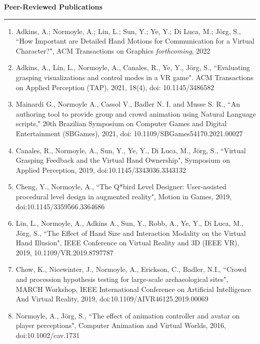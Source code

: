 {\Large {\bf  Peer-Reviewed Publications}}
\vspace{0.1cm}
\hrule
\medskip

\begin{enumerate}[leftmargin=*]

\item Adkins, A.; Normoyle, A.; Lin, L.; Sun, Y.; Ye, Y.; Di Luca, M.; J\"{o}rg, S., ``How Important are Detailed Hand Motions for Communication for a Virtual Character?", ACM Transactions on Graphics \emph{forthcoming}, 2022

\item Adkins, A., Lin, L., Normoyle, A., Canales, R., Ye, Y., J\"{o}rg, S., ``Evaluating grasping visualizations and control modes in a VR game". ACM Transactions on Applied Perception (TAP), 2021, 18(4), doi: 10.1145/3486582

\item Mainardi G., Normoyle A., Cassol V., Badler N. I. and Musse S. R., ``An authoring tool to provide group and crowd animation using Natural Language scripts," 20th Brazilian Symposium on Computer Games and Digital Entertainment (SBGames), 2021, doi: 10.1109/SBGames54170.2021.00027

\item Canales, R., Normoyle, A., Sun, Y., Ye, Y., Di Luca, M., J\"{o}rg, S., ``Virtual Grasping Feedback and the Virtual Hand Ownership", Symposium on Applied Perception, 2019, doi:10.1145/3343036.3343132

\item Cheng, Y., Normoyle, A., ``The Q*bird Level Designer: User-assisted procedural level design in augmented reality", Motion in Games, 2019, doi:10.1145/3359566.3364686

\item Lin, L., Normoyle, A., Adkins A., Sun, Y., Robb, A., Ye, Y., Di Luca, M., J\"{o}rg, S., ``The Effect of Hand Size and Interaction Modality on the Virtual Hand Illusion", IEEE Conference on Virtual Reality and 3D (IEEE VR), 2019, 10.1109/VR.2019.8797787

\item Chow, K., Nicewinter, J., Normoyle, A., Erickson, C., Badler, N.I., ``Crowd and procession hypothesis testing for large-scale archaeological sites", MARCH Workshop, IEEE International Conference on Artificial Intelligence And Virtual Reality, 2019, doi:10.1109/AIVR46125.2019.00069

\item Normoyle, A., J\"{o}rg, S., ``The effect of animation controller and avatar on player perceptions", 
Computer Animation and Virtual Worlds, 2016, doi:10.1002/cav.1731


\end{enumerate}
